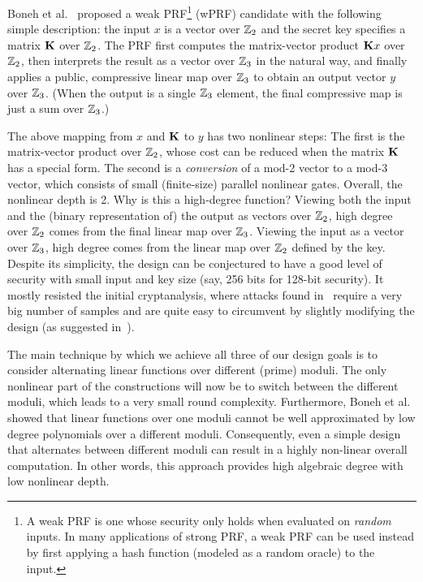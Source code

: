 Boneh et al.~\cite{boneh2018-darkmatter} proposed a weak PRF\footnote{A weak PRF is one whose security only holds when evaluated on {\em random} inputs. In many applications of strong PRF, a weak PRF can be used instead by first applying a hash function (modeled as a random oracle) to the input.} (wPRF) candidate with the following simple description: the input $x$ is a vector over  $\mathbb{Z}_2$ and the secret key specifies a matrix $\mat{K}$ over  $\mathbb{Z}_2$. The PRF first computes the matrix-vector product $\mat{K}x$ over  $\mathbb{Z}_2$, then interprets the result as a vector over $\mathbb{Z}_3$ in the natural way,  and finally applies a public, compressive linear map over $\mathbb{Z}_3$ to obtain an output vector $y$ over $\mathbb{Z}_3$. (When the output is a single $\mathbb{Z}_3$ element, the final compressive map is just a sum over $\mathbb{Z}_3$.)

The above mapping from $x$ and $\mat K$ to $y$ has two nonlinear steps: The first is the matrix-vector product over $\mathbb{Z}_2$, whose cost can be reduced when the matrix $\mat K$ has a special form. The second is a {\em conversion} of a mod-2 vector to a mod-3 vector, which consists of small  (finite-size) parallel nonlinear gates.  Overall, the nonlinear depth is 2. Why is this a high-degree function? Viewing both the input and the (binary representation of) the output as vectors over $\mathbb{Z}_2$, high degree over $\mathbb{Z}_2$ comes from the final linear map over $\mathbb{Z}_3$. Viewing the input as a vector over $\mathbb{Z}_3$, high degree comes from the linear map over $\mathbb{Z}_2$ defined by the key.  Despite its simplicity, the design can be conjectured to have a good level of security with small input and key size (say, 256 bits for 128-bit security). It mostly resisted the initial cryptanalysis, where attacks found in~\cite{cheon2020-adventures} require a very big number of samples and are quite easy to circumvent by slightly modifying the design (as suggested in~\cite{cheon2020-adventures}).

\iffalse
The main technique by which we achieve all three of our design goals is to consider alternating linear functions over different (prime) moduli. The only nonlinear part of the constructions will now be to switch between the different moduli, which leads to a very small round complexity. Furthermore, Boneh et al.~\cite{boneh2018-darkmatter} showed that linear functions over one moduli cannot be well approximated by low degree polynomials over a different moduli. Consequently, even a simple design that alternates between different moduli can result in a highly non-linear overall computation. In other words, this approach provides high algebraic degree with low nonlinear depth.


